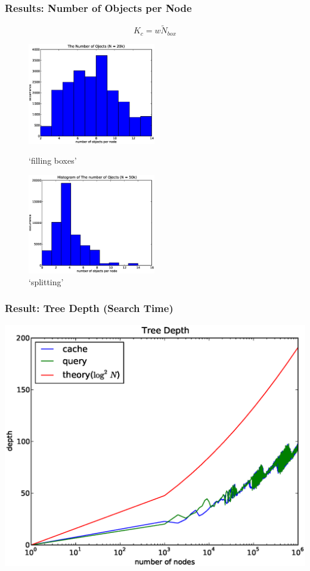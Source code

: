 \documentclass[red]{beamer}
\begin{document}
\begin{frame}
\frametitle{Results: Number of Objects per Node}
\begin{equation}
K_c=w\tilde N_{box}
\end{equation}
\begin{figure}
\begin{minipage}{5cm}
\centering
\includegraphics[width=2.2in]{figs/obj_node_20k.eps}
\caption{`filling boxes'} 
\end{minipage}
\begin{minipage}{5cm}
\centering
\includegraphics[width=2.2in]{figs/obj_node_50k.eps}
\caption{`splitting'}
\end{minipage}
\end{figure}
\end{frame}

\begin{frame}
\frametitle{Result: Tree Depth (Search Time)}
\begin{center}
\includegraphics[scale=0.3]{figs/depth.eps}
\end{center}
\end{frame}
\end{document}
